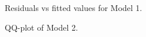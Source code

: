 \documentclass[review,12pt,authoryear]{elsarticle}
\begin{document}
\begin{linenumbers}
\begin{figure}
  \caption{Residuals vs fitted values for Model 1.}
\end{figure}

\begin{figure}
  \caption{QQ-plot of Model 2.}
\end{figure}


\end{linenumbers}
\end{document}
